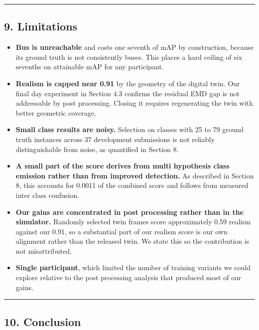 \documentclass[
  10pt,
]{article}
\providecommand{\tightlist}{%
  \setlength{\itemsep}{0pt}\setlength{\parskip}{0pt}}
\begin{document}
\begin{center}\rule{0.5\linewidth}{0.5pt}\end{center}

\subsection{9. Limitations}\label{limitations}

\begin{itemize}
\tightlist
\item
  \textbf{Bus is unreachable} and costs one seventh of mAP by
  construction, because its ground truth is not consistently buses. This
  places a hard ceiling of six sevenths on attainable mAP for any
  participant.
\item
  \textbf{Realism is capped near 0.91} by the geometry of the digital
  twin. Our final day experiment in Section 4.3 confirms the residual
  EMD gap is not addressable by post processing. Closing it requires
  regenerating the twin with better geometric coverage.
\item
  \textbf{Small class results are noisy.} Selection on classes with 25
  to 79 ground truth instances across 37 development submissions is not
  reliably distinguishable from noise, as quantified in Section 8.
\item
  \textbf{A small part of the score derives from multi hypothesis class
  emission rather than from improved detection.} As described in Section
  8, this accounts for 0.0011 of the combined score and follows from
  measured inter class confusion.
\item
  \textbf{Our gains are concentrated in post processing rather than in
  the simulator.} Randomly selected twin frames score approximately 0.59
  realism against our 0.91, so a substantial part of our realism score
  is our own alignment rather than the released twin. We state this so
  the contribution is not misattributed.
\item
  \textbf{Single participant}, which limited the number of training
  variants we could explore relative to the post processing analysis
  that produced most of our gains.
\end{itemize}

\begin{center}\rule{0.5\linewidth}{0.5pt}\end{center}

\subsection{10. Conclusion}\label{conclusion}
\end{document}
